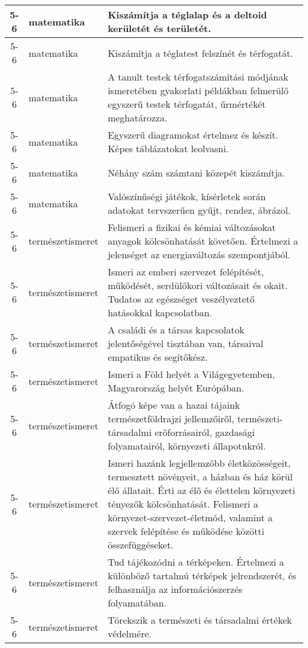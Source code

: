 \begin{small}
\begin{longtable}{c | p{2cm} |  p{11cm} }
              5-6 & matematika & Kiszámítja a téglalap és a deltoid kerületét és területét.
 \\ \hline
              5-6 & matematika & Kiszámítja a téglatest felszínét és térfogatát. \\ \hline
              5-6 & matematika & A tanult testek térfogatszámítási módjának ismeretében gyakorlati példákban felmerülő egyszerű testek térfogatát, űrmértékét meghatározza. \\ \hline
              5-6 & matematika & Egyszerű diagramokat értelmez és  készít. Képes táblázatokat leolvasni.
 \\ \hline
              5-6 & matematika & Néhány szám számtani közepét kiszámítja. \\ \hline
              5-6 & matematika & Valószínűségi játékok, kísérletek során adatokat tervszerűen gyűjt, rendez, ábrázol. \\ \hline
              5-6 & természetismeret & Felismeri a fizikai és kémiai változásokat anyagok kölcsönhatását követően. Értelmezi a jelenséget az energiaváltozás szempontjából. \\ \hline
              5-6 & természetismeret & Ismeri az emberi szervezet felépítését, működését, serdülőkori változásait és okait. Tudatos az egészséget veszélyeztető hatásokkal kapcsolatban. \\ \hline
              5-6 & természetismeret & A családi és a társas kapcsolatok jelentőségével tisztában van, társaival empatikus és segítőkész. \\ \hline
              5-6 & természetismeret & Ismeri a Föld helyét a Világegyetemben, Magyarország helyét Európában. \\ \hline
              5-6 & természetismeret & Átfogó képe van a hazai tájaink természetföldrajzi jellemzőiről, természeti-társadalmi erőforrásairól, gazdasági folyamatairól, környezeti állapotukról. \\ \hline
              5-6 & természetismeret & Ismeri hazánk legjellemzőbb életközösségeit, termesztett növényeit, a házban és ház körül élő állatait. Érti az élő és élettelen környezeti tényezők kölcsönhatását. Felismeri a környezet-szervezet-életmód, valamint a szervek felépítése és működése közötti összefüggéseket. \\ \hline
              5-6 & természetismeret & Tud tájékozódni a térképeken. Értelmezi a különböző tartalmú térképek jelrendszerét, és felhasználja az információszerzés folyamatában. \\ \hline
              5-6 & természetismeret & Törekszik a természeti és társadalmi értékek védelmére. \\ \hline

\end{longtable}
\end{small}
